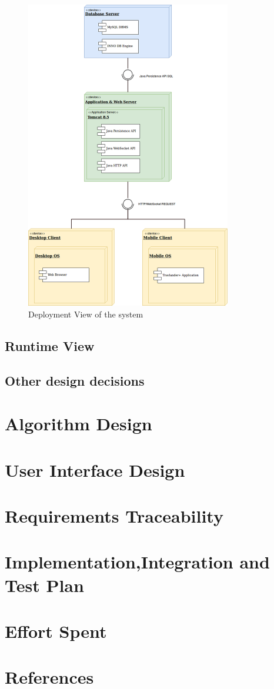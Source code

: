 \documentclass[numbers=noenddot, 12pt, a4paper, oneside]{scrbook}
\begin{document}
\begin{figure}[H]
	\centering
	\includegraphics[width=0.80\textwidth]{images/DeploymentView}
	\caption{Deployment View of the system}
\end{figure}


\section{Runtime View}

\section{Other design decisions}

\chapter{Algorithm Design}

\chapter{User Interface Design}

\chapter{Requirements Traceability}

\chapter{Implementation,Integration and Test Plan}


\chapter{Effort Spent}


\chapter{References}
\end{document}
